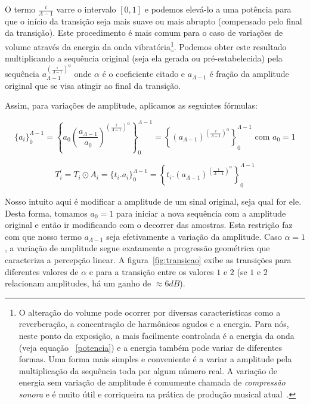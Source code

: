 O termo $\frac{i}{\Lambda-1}$ varre o intervalo $[0,1]$ e podemos elevá-lo a uma potência
para que o início da transição seja mais suave ou mais abrupto (compensado pelo final
da transição). Este procedimento é mais comum para o caso de variações de volume através da energia
da onda vibratória\footnote{O alteração do volume pode ocorrer por diversas características como
a reverberação, a concentração de harmônicos agudos e a energia. Para nós, neste ponto da exposição,
a mais facilmente controlada é a energia da onda (veja equação ~\ref{potencia}) e a energia também pode variar de diferentes formas.
Uma forma mais simples e conveniente é a variar a amplitude pela multiplicação da sequência toda
por algum número real. A variação de energia sem variação de
amplitude é comumente chamada de \emph{compressão sonora} e é muito útil e corriqueira na prática
de produção musical atual~\cite{compressao}.}. Podemos obter este resultado multiplicando a sequência original
(seja ela gerada ou pré-estabelecida) pela sequência $a_{\Lambda-1}^{\left( \frac{i}{\Lambda-1} \right )^\alpha}$
onde $\alpha$ é o coeficiente citado e $a_{\Lambda-1}$ é fração da amplitude original que se visa atingir ao final da transição.

Assim, para variações de amplitude, aplicamos as seguintes fórmulas:

\begin{equation}\label{seqAmp}
\{a_i\}_0^{\Lambda-1}=\left \{ a_0 \left ( \frac{a_{\Lambda-1}}{a_0} \right )^{\left ( \frac{i}{\Lambda-1} \right )^\alpha} \right \}_0^{\Lambda-1}=\left \{ \left ( {a_{\Lambda-1}} \right )^{\left ( \frac{i}{\Lambda-1} \right )^\alpha} \right \}_0^{\Lambda-1} \text{ com } a_0=1
\end{equation}

\begin{equation}\label{transAmp}
T_i^{'}=T_i \odot A_i = \{t_i . a_i\}_0^{\Lambda-1}=\left \{ t_i . (a_{\Lambda-1} )^{\left ( \frac{i}{\Lambda-1} \right )^\alpha} \right \}_0^{\Lambda-1}
\end{equation}

Nosso intuito aqui é modificar a amplitude de um sinal original, seja qual for ele. Desta forma, tomamos
$a_0=1$ para iniciar a nova sequência com a amplitude original e então ir modificando com o decorrer das amostras.
Esta restrição faz com que nosso termo $a_{\Lambda-1}$ seja efetivamente a variação da amplitude.
Caso $\alpha=1$, a variação de amplitude segue exatamente a progressão geométrica que caracteriza
a percepção linear. A figura~\ref{fig:transicao} exibe as transições para diferentes valores de $\alpha$ e para a transição entre os valores $1$ e $2$ (se $1$ e $2$ relacionam amplitudes, há um ganho de $\approx 6dB$).



